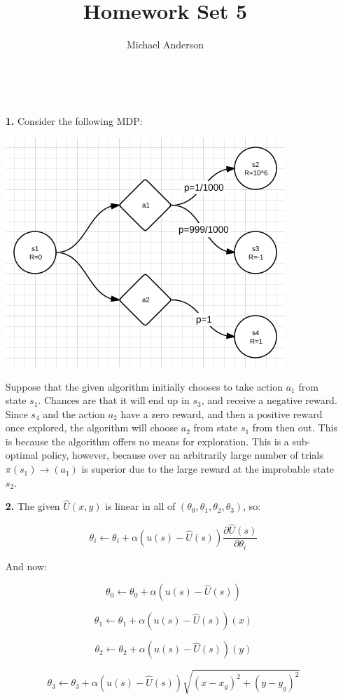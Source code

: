 \documentclass{article}
\author{Michael Anderson}
\title{Homework Set 5}
\begin{document}
\maketitle
{}
\\
\flushleft
\newpage

\begin{enumerate}
\item[\textbf{1.}]
Consider the following MDP:

\includegraphics{mdp.png}

Suppose that the given algorithm initially chooses to take action $a_1$ from
state $s_1$. Chances are that it will end up in $s_3$, and receive a negative
reward. Since $s_4$ and the action $a_2$ have a zero reward, and then a 
positive reward once explored, the algorithm
will choose $a_2$ from state $s_1$ from then out. This is because the algorithm
offers no means for exploration. This is a sub-optimal policy, however, because over an
arbitrarily large number of trials $\pi(s_1) \rightarrow (a_1)$ is superior
due to the large reward at the improbable state $s_2$.

\item[\textbf{2.}]
The given $\hat{U}(x,y)$ is linear in all of $(\theta_0,\theta_1,\theta_2,\theta_3)$, so:

\[
\theta_i \leftarrow \theta_i + \alpha(u(s)-\hat{U}(s))
 \frac{\partial \hat{U}(s)}{\partial \theta_i}
\]

And now:

\[
\theta_0 \leftarrow \theta_0 + \alpha(u(s)-\hat{U}(s))
\]

\[
\theta_1 \leftarrow \theta_1 + \alpha(u(s)-\hat{U}(s))(x)
\]

\[
\theta_2 \leftarrow \theta_2 + \alpha(u(s)-\hat{U}(s))(y)
\]

\[
\theta_3 \leftarrow \theta_3 + \alpha(u(s)-\hat{U}(s))\sqrt{(x-x_g)^2 + (y-y_g)^2}
\]

\end{enumerate}
\end{document}
